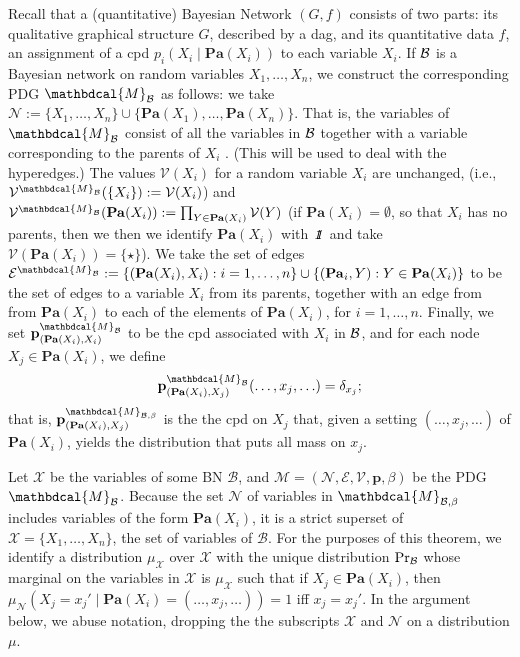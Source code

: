 \documentclass[letterpaper]{article} %
\theoremstyle{plain}
\theoremstyle{definition}
\theoremstyle{remark}
\newcommand\mat[1]{\mathbf{#1}}
\newcommand\Pa{\mathbf{Pa}}
\newcommand{\V}{\mathcal V}
\newcommand{\N}{\mathcal N}
\newcommand{\Ed}{\mathcal E}
\newcommand{\pdgvars}[1][]{(\N#1, \Ed#1, \V#1, \mat p#1, \beta#1)}
\newcommand{\dg}[1]{\mathbdcal{#1}}
\newcommand{\pdgunit}{\mathrlap{\mathit 1} \mspace{2.3mu}\mathit 1}
\newcommand{\PDGof}[1]{{\dg M}_{#1}}
\begin{document}
	\begin{defn}\label{def:bn2PDG}
Recall that a (quantitative) Bayesian Network $(G, f)$ consists of two
parts: its qualitative graphical structure $G$, 
described by a dag,
and its quantitative data $f$, an assignment of 
a cpd $p_i(X_i \mid \Pa(X_i))$ to each variable $X_i$.
If $\cal B$ is a Bayesian network on random variables
$X_1, \ldots, X_n$, we construct the corresponding PDG
$\PDGof{{\mathcal B}}$
			as follows: we take $\N := \{X_1, \ldots, X_n \} \cup
			\{ \Pa(X_1), \ldots, \Pa(X_n)\}$.  
That is, the variables of 
	  $\PDGof{{\mathcal B}}$
consist of all the variables in
${\cal B}$ together with a variable corresponding to the parents
of $X_i$%
.  (This will be used to deal with the hyperedges.) 
			The values $\V(X_i)$ for a random variable
			$X_i$ are unchanged, 
(i.e., $\V^{\PDGof{{\mathcal B}}}(\{X_i\}) := \V(X_i)$)
and $\V^{\PDGof{{\mathcal B}}}(\Pa(X_i)) := \prod_{Y \in \Pa(X_i)} \V(Y)$
(if $\Pa(X_i) = \emptyset$, so that $X_i$ has no parents, then we 
then we identify $\Pa(X_i)$ with $\pdgunit$ and
take $\V(\Pa(X_i)) = \{\star\}$). 
We take the set of edges $\Ed^{\PDGof{{\mathcal B}}} := \{ (\Pa(X_i), X_i) : 
i = 1, \ldots, n \} \cup \{ (\Pa_i, Y) : Y \in
			\Pa(X_i)\}$ to be the set of edges to a variable $X_i$
	  from its parents, together with an edge from
	  from $\Pa(X_i)$ to each of the elements of $\Pa(X_i)$, for
	  $i = 1, \ldots, n$.  
	Finally, we set $\mat p^{\PDGof{{\mathcal
				B}}}_{(\Pa(X_i), X_i)}$ to be the cpd associated
			with $X_i$ in $\cal B$, and for each node $X_j \in \Pa(X_i)$,
			we define
	\[ \mat p^{\PDGof{\mathcal B}}_{(\Pa(X_i),
			  X_j)}(\ldots, x_j, \ldots) = \delta_{x_j};\]
that is,
$\mat p_{(\Pa(X_i), X_j)}^{\PDGof{\mathcal B, \beta}}$ is the the cpd 
on $X_j$ that, given a setting $(\ldots, x_j, \ldots)$ of $\Pa(X_i)$, yields the distribution that puts all mass on $x_j$. 
\end{defn}



Let $\mathcal X$ be the variables of some BN $\mathcal B$, and
$\mathcal M = \pdgvars$ 
be the PDG $\PDGof{\mathcal B}$.
Because the set  $\mathcal N$ of variables in $\PDGof{{\mathcal
    B},\beta}$ includes  
variables of the form $\Pa(X_i)$, it is a strict superset of
$\mathcal X = \{X_1,\ldots, X_n\}$, the set of variables of $\mathcal B$.
For the purposes of this theorem, we identify a distribution
$\mu_{\mathcal X}$ over $\mathcal X$ 
with the unique distribution $\Pr_{\cal B}$ whose marginal on the
variables in $\mathcal X$ is $\mu_{\mathcal X}$ such that if $X_j \in
\Pa(X_i)$, then 
$\mu_{\mathcal N}(X_j = x_j' \mid \Pa(X_i) = (\ldots, x_j,\ldots)) =
1$ iff $x_j = x_j'$.  In the argument below, we abuse notation,
dropping the the subscripts $\mathcal X$ and $\mathcal N$ on a
distribution $\mu$.
\end{document}

